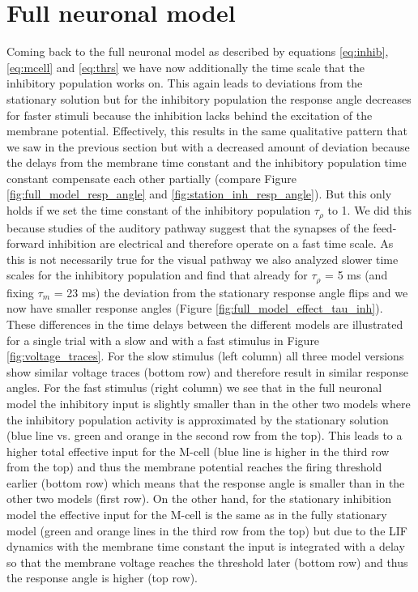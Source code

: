     \section{Full neuronal model}
    Coming back to the full neuronal model as described by equations \ref{eq:inhib}, \ref{eq:mcell} and \ref{eq:thrs} we have now additionally the time scale that the inhibitory population works on.
    This again leads to deviations from the stationary solution but for the inhibitory population the response angle decreases for faster stimuli because the inhibition lacks behind the excitation of the membrane potential.
    Effectively, this results in the same qualitative pattern that we saw in the previous section but with a decreased amount of deviation because the delays from the membrane time constant and the inhibitory population time constant compensate each other partially (compare Figure \ref{fig:full_model_resp_angle} and \ref{fig:station_inh_resp_angle}).
    But this only holds if we set the time constant of the inhibitory population $\tau_{\rho}$ to 1.
    We did this because studies of the auditory pathway suggest that the synapses of the feed-forward inhibition are electrical and therefore operate on a fast time scale.
    As this is not necessarily true for the visual pathway we also analyzed slower time scales for the inhibitory population and find that already for $\tau_{\rho}$ = 5 ms (and fixing $\tau_m$ = 23 ms) the deviation from the stationary response angle flips and we now have smaller response angles (Figure \ref{fig:full_model_effect_tau_inh}).\\
    These differences in the time delays between the different models are illustrated for a single trial with a slow and with a fast stimulus in Figure \ref{fig:voltage_traces}.
    For the slow stimulus (left column) all three model versions show similar voltage traces (bottom row) and therefore result in similar response angles.
    For the fast stimulus (right column) we see that in the full neuronal model the inhibitory input is slightly smaller than in the other two models where the inhibitory population activity is approximated by the stationary solution (blue line vs. green and orange in the second row from the top).
    This leads to a higher total effective input for the M-cell (blue line is higher in the third row from the top) and thus the membrane potential reaches the firing threshold earlier (bottom row) which means that the response angle is smaller than in the other two models (first row).
    On the other hand, for the stationary inhibition model the effective input for the M-cell is the same as in the fully stationary model (green and orange lines in the third row from the top) but due to the LIF dynamics with the membrane time constant the input is integrated with a delay so that the membrane voltage reaches the threshold later (bottom row) and thus the response angle is higher (top row).
